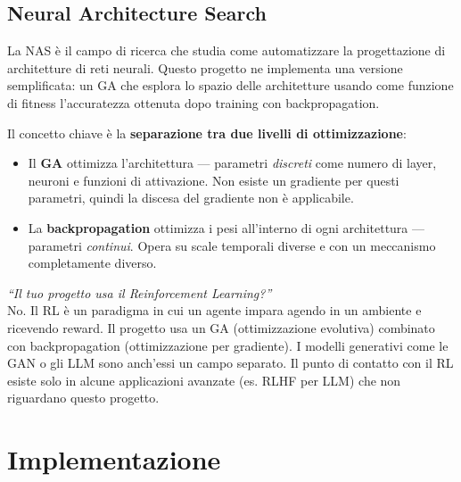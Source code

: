 \documentclass[12pt, a4paper]{article}
\begin{document}
\subsection{Neural Architecture Search}

La NAS è il campo di ricerca che studia come automatizzare la progettazione
di architetture di reti neurali. Questo progetto ne implementa una versione
semplificata: un GA che esplora lo spazio delle architetture usando come
funzione di fitness l'accuratezza ottenuta dopo training con backpropagation.

Il concetto chiave è la \textbf{separazione tra due livelli di ottimizzazione}:

\begin{itemize}
    \item Il \textbf{GA} ottimizza l'architettura --- parametri \emph{discreti}
          come numero di layer, neuroni e funzioni di attivazione. Non esiste
          un gradiente per questi parametri, quindi la discesa del gradiente
          non è applicabile.
    \item La \textbf{backpropagation} ottimizza i pesi all'interno di ogni
          architettura --- parametri \emph{continui}. Opera su scale temporali
          diverse e con un meccanismo completamente diverso.
\end{itemize}

\begin{domanda}
\textit{``Il tuo progetto usa il Reinforcement Learning?''}\\
No. Il RL è un paradigma in cui un agente impara agendo in un ambiente e
ricevendo reward. Il progetto usa un GA (ottimizzazione evolutiva) combinato
con backpropagation (ottimizzazione per gradiente). I modelli generativi come
le GAN o gli LLM sono anch'essi un campo separato. Il punto di contatto con
il RL esiste solo in alcune applicazioni avanzate (es. RLHF per LLM) che non
riguardano questo progetto.
\end{domanda}

\newpage

\section{Implementazione}
\end{document}
